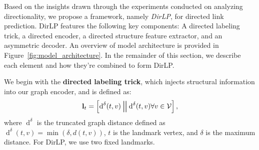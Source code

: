 \documentclass{article}
\DeclareMathOperator*{\concat}{\scalerel*{\Vert}{\sum}}
\begin{document}
Based on the insights drawn through the experiments conducted on analyzing directionality, we propose a framework, namely \emph{DirLP}, for directed link prediction. DirLP features the following key components: A directed labeling trick, a directed encoder, a directed structure feature extractor, and an asymmetric decoder. An overview of model architecture is provided in Figure~\ref{fig:model_architecture}.  In the remainder of this section, we describe each element and how they're combined to form DirLP.

We begin with the \textbf{directed labeling trick}, which injects structural information into our graph encoder, and is defined as:
    \begin{equation}\label{eq:dir_de}
        \mathbf{l}_t = \left[\operatorname{d}^\delta(t, v) \concat \operatorname{d}^{\delta}(t, v) \forall v \in \mathcal{V} \right], 
    \end{equation}
where $\operatorname{d}^\delta$ is the truncated graph distance defined as $\operatorname{d}^\delta(t, v) = \operatorname{min}(\delta, d(t, v))$, $t$ is the landmark vertex, and $\delta$ is the maximum distance. For DirLP, we use two fixed landmarks.
\end{document}
